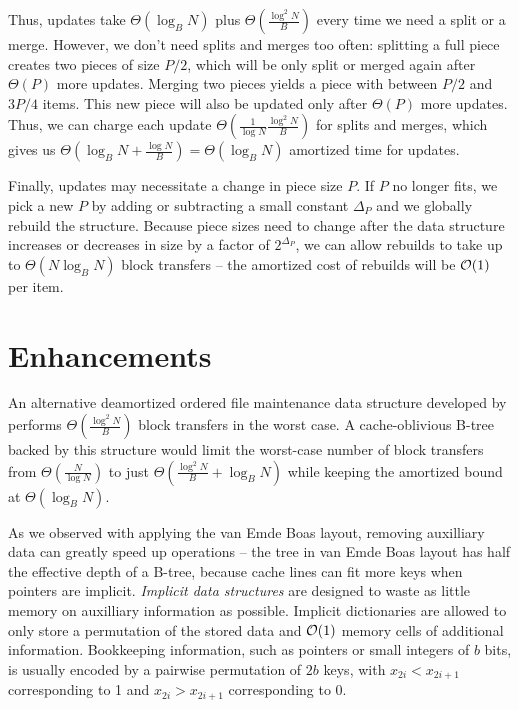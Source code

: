 Thus, updates take $\Theta(\log_B N)$ plus $\Theta(\frac{\log^2 N}{B})$
every time we need a split or a merge. However, we don't need splits and
merges too often: splitting a full piece creates two pieces of size $P/2$,
which will be only split or merged again after $\Theta(P)$ more updates.
Merging two pieces yields a piece with between $P/2$ and $3P/4$ items.
This new piece will also be updated only after $\Theta(P)$ more updates.
Thus, we can charge each update $\Theta(\frac{1}{\log N}\frac{\log^2 N}{B})$
for splits and merges, which gives us $\Theta(\log_B N+\frac{\log N}{B})=
\Theta(\log_B N)$ amortized time for updates.

Finally, updates may necessitate a change in piece size $P$. If $P$
no longer fits, we pick a new $P$ by adding or subtracting a small constant
$\Delta_P$ and we globally rebuild the structure.
Because piece sizes need to change after the data structure increases
or decreases in size by a factor of $2^{\Delta_P}$, we can allow
rebuilds to take up to $\Theta(N\log_B N)$ block transfers -- the amortized
cost of rebuilds will be $\mathcal{O}(1)$ per item.

\section{Enhancements}
An alternative deamortized ordered file maintenance data structure
developed by \cite{willard92} performs $\Theta(\frac{\log^2 N}{B})$
block transfers in the worst case. A cache-oblivious B-tree backed by this
structure would limit the worst-case number of block transfers from
$\Theta(\frac{N}{\log N})$ to just $\Theta(\frac{\log^2 N}{B}+\log_B
N)$ while keeping the amortized bound at $\Theta(\log_B N)$.


As we observed with applying the van Emde Boas layout, removing auxilliary
data can greatly speed up operations -- the tree in van Emde Boas layout has
half the effective depth of a B-tree, because cache lines can fit more keys
when pointers are implicit.
\emph{Implicit data structures} are designed to waste as little memory on
auxilliary information as possible. Implicit dictionaries are allowed to only
store a permutation of the stored data and $\mathcal{O}(1)$ memory cells of additional
information. Bookkeeping information, such as pointers or small integers
of $b$ bits, is usually encoded by a pairwise permutation of $2b$ keys,
with $x_{2i} < x_{2i+1}$ corresponding to 1 and $x_{2i} > x_{2i+1}$
corresponding to 0.

